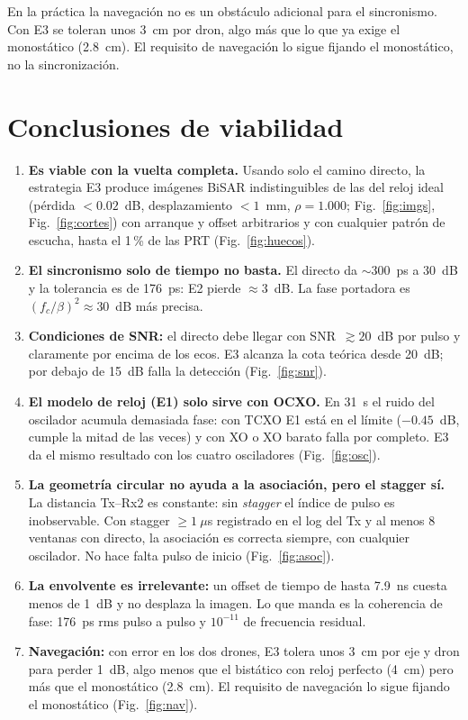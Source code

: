 \documentclass[11pt,a4paper]{article}
\newcommand{\fig}[1]{Fig.~\ref{#1}}
\begin{document}
En la práctica la navegación no es un obstáculo adicional para el
sincronismo. Con E3 se toleran unos 3~cm por dron, algo más que lo que ya
exige el monostático (2.8~cm). El requisito de navegación lo sigue fijando
el monostático, no la sincronización.

\section{Conclusiones de viabilidad}
\label{sec:concl}

\begin{enumerate}
\item \textbf{Es viable con la vuelta completa.} Usando solo el camino
  directo, la estrategia E3 produce imágenes BiSAR indistinguibles de las
  del reloj ideal (pérdida $<0.02$~dB, desplazamiento $<1$~mm, $\rho=1.000$;
  \fig{fig:imgs}, \fig{fig:cortes}) con arranque y offset arbitrarios y con
  cualquier patrón de escucha, hasta el 1\,\% de las PRT
  (\fig{fig:huecos}).
\item \textbf{El sincronismo solo de tiempo no basta.} El directo da
  $\sim$300~ps a 30~dB y la tolerancia es de 176~ps: E2 pierde
  $\approx3$~dB. La fase portadora es $(f_c/\beta)^2\approx30$~dB más
  precisa.
\item \textbf{Condiciones de SNR:} el directo debe llegar con
  SNR~$\gtrsim20$~dB por pulso y claramente por encima de los ecos. E3
  alcanza la cota teórica desde 20~dB; por debajo de 15~dB falla la
  detección (\fig{fig:snr}).
\item \textbf{El modelo de reloj (E1) solo sirve con OCXO.} En 31~s el ruido
  del oscilador acumula demasiada fase: con TCXO E1 está en el límite
  ($-0.45$~dB, cumple la mitad de las veces) y con XO o XO barato falla por
  completo. E3 da el mismo resultado con los cuatro osciladores
  (\fig{fig:osc}).
\item \textbf{La geometría circular no ayuda a la asociación, pero el stagger
  sí.} La distancia Tx--Rx2 es constante: sin \emph{stagger} el índice de
  pulso es inobservable. Con stagger $\ge1~\mu$s registrado en el log del Tx
  y al menos 8 ventanas con directo, la asociación es correcta siempre, con
  cualquier oscilador. No hace falta pulso de inicio (\fig{fig:asoc}).
\item \textbf{La envolvente es irrelevante:} un offset de tiempo de hasta
  7.9~ns cuesta menos de 1~dB y no desplaza la imagen. Lo que manda es la
  coherencia de fase: 176~ps rms pulso a pulso y $10^{-11}$ de frecuencia
  residual.
\item \textbf{Navegación:} con error en los dos drones, E3 tolera unos 3~cm
  por eje y dron para perder 1~dB, algo menos que el bistático con reloj
  perfecto (4~cm) pero más que el monostático (2.8~cm). El requisito de
  navegación lo sigue fijando el monostático (\fig{fig:nav}).
\end{enumerate}
\end{document}
